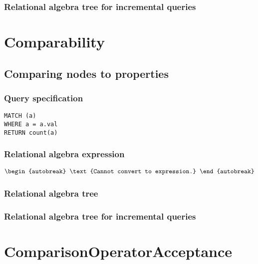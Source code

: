 
\subsubsection*{Relational algebra tree for incremental queries}

\section{Comparability}


\subsection{Comparing nodes to properties}

\subsubsection*{Query specification}

\begin{lstlisting}
MATCH (a)
WHERE a = a.val
RETURN count(a)
\end{lstlisting}

\subsubsection*{Relational algebra expression}

\begin{align*}
\begin{autobreak}
\text{Cannot convert to expression.}
\end{autobreak}
\end{align*}

\subsubsection*{Relational algebra tree}


\subsubsection*{Relational algebra tree for incremental queries}

\section{ComparisonOperatorAcceptance}


